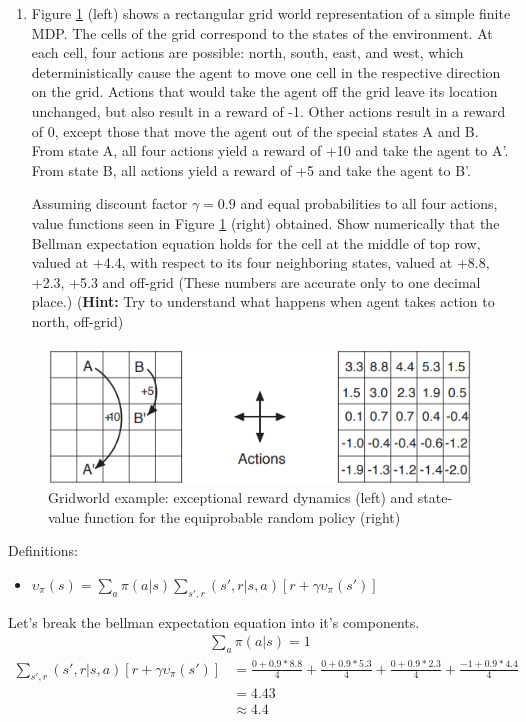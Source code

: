 \documentclass[11pt,onecolumn]{article}
\begin{document}
\begin{enumerate}
    \item Figure \ref{fig:book3.14} (left) shows a rectangular grid world representation of a simple finite MDP. The cells of the grid correspond to the states of the environment. At each cell, four actions are possible: north, south, east, and west, which deterministically cause the agent to move one cell in the respective direction on the grid. Actions that would take the agent off the grid leave its location unchanged, but also result in a reward of -1. Other actions result in a reward of 0, except those that move the agent out of the special states A and B. From state A, all four actions yield a reward of +10 and take the agent to A'. From state B, all actions yield a reward of +5 and take the agent to B'. 
    
    Assuming discount factor $\gamma=0.9$ and equal probabilities to all four actions, value functions seen in Figure \ref{fig:book3.14} (right) obtained. Show numerically that the Bellman expectation equation holds for the cell at the middle of top row, valued at +4.4, with respect to its four neighboring states, valued at +8.8, +2.3, +5.3 and off-grid (These numbers are accurate only to one decimal place.) (\textbf{Hint:} Try to understand what happens when agent takes action to north, off-grid)
    
\end{enumerate}

\begin{figure}[htbp]
    \centering
    \includegraphics[width=0.6\linewidth]{figures/mdp_grid.png}
    
    \caption{Gridworld example: exceptional reward dynamics (left) and state-value function for the equiprobable random policy (right)}
    \label{fig:book3.14}
\end{figure}
\setlength{\parskip}{6pt}

Definitions:
\begin{itemize}
    \item $\upsilon_{\pi}(s) = \sum_{a} \pi(a \vert s) \sum_{s \prime, r}(s\prime, r \vert s, a)[r + \gamma\upsilon_{\pi}(s\prime)]$
\end{itemize}
Let's break the bellman expectation equation into it's components.
\begin{equation}
    \begin{aligned}
        \sum_{a} \pi(a \vert s) = 1
    \end{aligned}
\end{equation}
\begin{equation}
    \begin{aligned}
        \sum_{s \prime, r}(s\prime, r \vert s, a)[r + \gamma\upsilon_{\pi}(s\prime)] & = \frac{0+0.9*8.8}{4}+\frac{0+0.9*5.3}{4} + \frac{0+0.9*2.3}{4} + \frac{-1+0.9*4.4}{4} \\ 
        & = 4.43 \\ 
        & \approx 4.4
    \end{aligned}
\end{equation}
\end{document}
